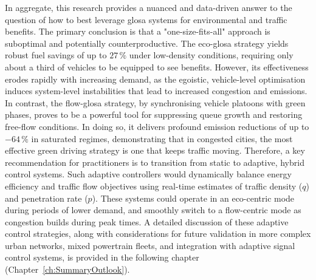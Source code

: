 In aggregate, this research provides a nuanced and data-driven answer to the question of how to best leverage \ac{glosa} systems for environmental and traffic benefits. The primary conclusion is that a "one-size-fits-all" approach is suboptimal and potentially counterproductive.
\mynewline
The \ac{eco-glosa} strategy yields robust fuel savings of up to $27\,\%$ under low-density conditions, requiring only about a third of vehicles to be equipped to see benefits. However, its effectiveness erodes rapidly with increasing demand, as the egoistic, vehicle-level optimisation induces system-level instabilities that lead to increased congestion and emissions. In contrast, the \ac{flow-glosa} strategy, by synchronising vehicle platoons with green phases, proves to be a powerful tool for suppressing queue growth and restoring free-flow conditions. In doing so, it delivers profound emission reductions of up to $-64\,\%$ in saturated regimes, demonstrating that in congested cities, the most effective green driving strategy is one that keeps traffic moving.
\mynewline
Therefore, a key recommendation for practitioners is to transition from static to adaptive, hybrid control systems. Such adaptive controllers would dynamically balance energy efficiency and traffic flow objectives using real-time estimates of traffic density ($q$) and penetration rate ($p$). These systems could operate in an eco-centric mode during periods of lower demand, and smoothly switch to a flow-centric mode as congestion builds during peak times. A detailed discussion of these adaptive control strategies, along with considerations for future validation in more complex urban networks, mixed powertrain fleets, and integration with adaptive signal control systems, is provided in the following chapter (Chapter~\ref{ch:SummaryOutlook}).

